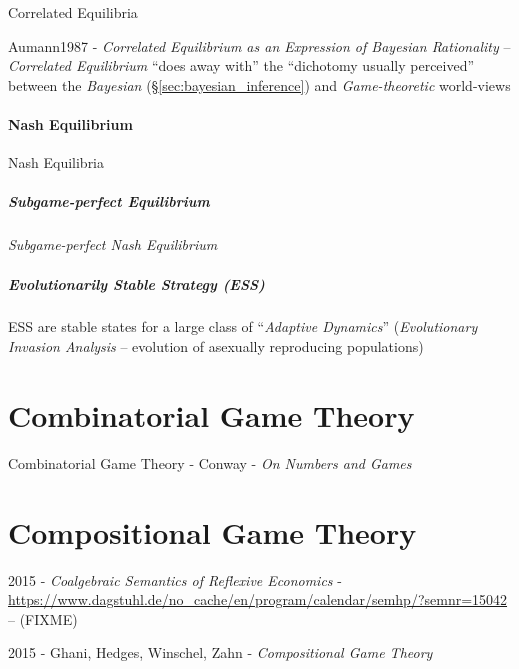 \begin{itemize}
Correlated Equilibria

Aumann1987 - \emph{Correlated Equilibrium as an Expression of Bayesian
  Rationality} -- \emph{Correlated Equilibrium} ``does away with'' the
``dichotomy usually perceived'' between the \emph{Bayesian}
(\S\ref{sec:bayesian_inference}) and \emph{Game-theoretic} world-views



\paragraph{Nash Equilibrium}\label{sec:nash_equilibrium}\hfill

Nash Equilibria



\subparagraph{Subgame-perfect Equilibrium}\label{sec:subgame_perfect}\hfill

\emph{Subgame-perfect Nash Equilibrium}



\subparagraph{Evolutionarily Stable Strategy (ESS)}\label{sec:ess}\hfill

ESS are stable states for a large class of ``\emph{Adaptive Dynamics}''
(\emph{Evolutionary Invasion Analysis} -- evolution of asexually reproducing
populations)



\section{Combinatorial Game Theory}\label{sec:combinatorial_game_theory}

Combinatorial Game Theory - Conway  - \emph{On Numbers and Games}



\section{Compositional Game Theory}\label{sec:compositional_game_theory}

2015 - \emph{Coalgebraic Semantics of Reflexive Economics} -
\url{https://www.dagstuhl.de/no_cache/en/program/calendar/semhp/?semnr=15042} --
(FIXME)

2015 - Ghani, Hedges, Winschel, Zahn - \emph{Compositional Game Theory}


\end{itemize}
